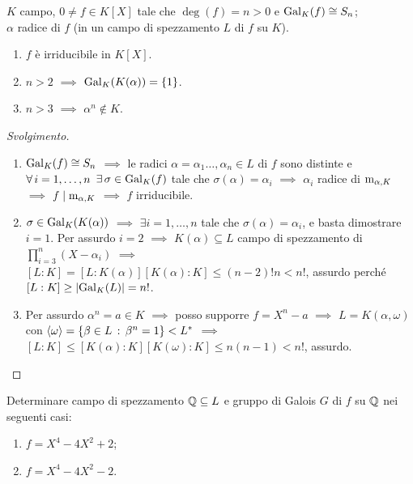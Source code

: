 \begin{eser}
$K$ campo, $0\ne f\in K[X]$ tale che $\deg(f)=n>0$ e $\Gal[K]{f}\iso S_n$; \\
$\alpha$ radice di $f$ (in un campo di spezzamento $L$ di $f$ su $K$).
\begin{enumerate}
\item $f$ è irriducibile in $K[X]$.
\item $n>2$ $\implies$ $\Gal[K]{K(\alpha)}=\{1\}$.
\item $n>3$ $\implies$ $\alpha^n\not\in K$.
\end{enumerate}
\end{eser}

\begin{proof}[Svolgimento]
\begin{enumerate}
\item $\Gal[K]{f}\iso S_n$ $\implies$ le radici $\alpha=\alpha_1\dots,\alpha_n\in L$ di $f$ sono distinte e $\all i=1,\dots,n$ $\exi\sigma\in\Gal[K]{f}$ tale che $\sigma(\alpha)=\alpha_i$ $\implies$ $\alpha_i$ radice di $\polmin_{\alpha,K}$ $\implies$ $f\dvd\polmin_{\alpha,K}$ $\implies$ $f$ irriducibile.
\item $\sigma\in\Gal[K]{K(\alpha)}$ $\implies$ $\exi i=1,\dots,n$ tale che $\sigma(\alpha)=\alpha_i$, e basta dimostrare $i=1$. Per assurdo $i=2$ $\implies$ $K(\alpha)\subseteq L$ campo di spezzamento di $\prod_{i=3}^n(X-\alpha_i)$ $\implies$ $[L:K]=[L:K(\alpha)][K(\alpha):K]\le(n-2)!n<n!$, assurdo perché $[L:K]\ge\card{\Gal[K]{L}}=n!$.
\item Per assurdo $\alpha^n=a\in K$ $\implies$ posso supporre $f=X^n-a$ $\implies$ $L=K(\alpha,\omega)$ con $\gen{\omega}=\{\beta\in L\st\beta^n=1\}<L^*$ $\implies$ $[L:K]\le[K(\alpha):K][K(\omega):K]\le n(n-1)<n!$, assurdo. \qedhere
\end{enumerate}
\end{proof}


\begin{eser}
Determinare campo di spezzamento $\Q\subseteq L$ e gruppo di Galois $G$ di $f$ su $\Q$ nei seguenti casi:
\begin{enumerate}
\item $f=X^4-4X^2+2$;
\item $f=X^4-4X^2-2$.
\end{enumerate}
\end{eser}

